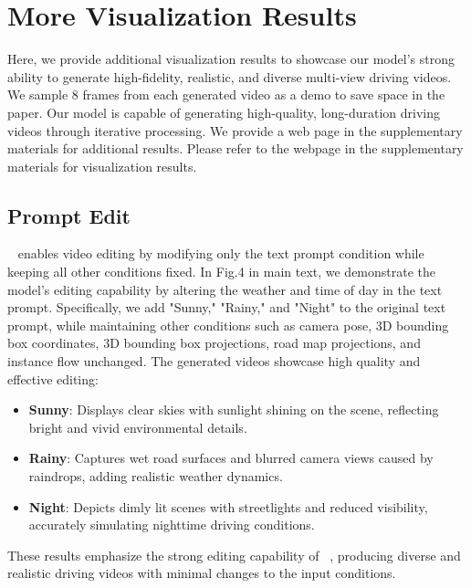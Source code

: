

\section{More Visualization Results}
Here, we provide additional visualization results to showcase our model's strong ability to generate high-fidelity, realistic, and diverse multi-view driving videos. 
We sample 8 frames from each generated video as a demo to save space in the paper. Our model is capable of generating high-quality, long-duration driving videos through iterative processing. 
We provide a web page in the supplementary materials for additional results. Please refer to the webpage in the supplementary materials for visualization results.





\subsection{Prompt Edit}
\label{app:edit}
\titleDef~ enables video editing by modifying only the text prompt condition while keeping all other conditions fixed.  
In Fig.4 in main text, we demonstrate the model's editing capability by altering the weather and time of day in the text prompt. Specifically, we add "Sunny," "Rainy," and "Night" to the original text prompt, while maintaining other conditions such as camera pose, 3D bounding box coordinates, 3D bounding box projections, road map projections, and instance flow unchanged. The generated videos showcase high quality and effective editing:  
\begin{itemize}
    \item \textbf{Sunny}: Displays clear skies with sunlight shining on the scene, reflecting bright and vivid environmental details.  
    \item \textbf{Rainy}: Captures wet road surfaces and blurred camera views caused by raindrops, adding realistic weather dynamics.  
    \item \textbf{Night}: Depicts dimly lit scenes with streetlights and reduced visibility, accurately simulating nighttime driving conditions.  
\end{itemize}
These results emphasize the strong editing capability of \titleDef~, producing diverse and realistic driving videos with minimal changes to the input conditions.



